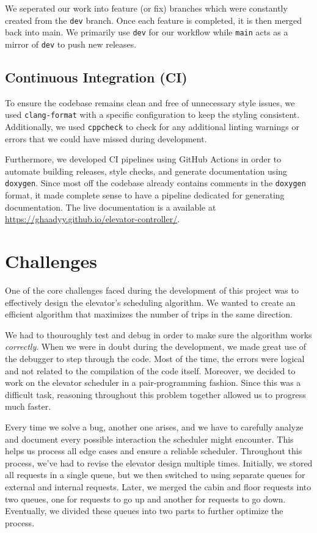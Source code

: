 \documentclass[12pt, a4paper]{report}
\begin{document}
We seperated our work into feature (or fix) branches which were constantly created from the \texttt{dev} branch. Once each feature is completed, it is then merged back into main. We primarily use \texttt{dev} for our workflow while \texttt{main} acts as a mirror of \texttt{dev} to push new releases.

\section{Continuous Integration (CI)}

To ensure the codebase remains clean and free of unnecessary style issues, we used \texttt{clang-format} with a specific configuration to keep the styling consistent. Additionally, we used \texttt{cppcheck} to check for any additional linting warnings or errors that we could have missed during development.

Furthermore, we developed CI pipelines using GitHub Actions in order to automate building releases, style checks, and generate documentation using \texttt{doxygen}. Since most off the codebase already contains comments in the \texttt{doxygen} format, it made complete sense to have a pipeline dedicated for generating documentation. The live documentation is a available at \href{https://ghaadyy.github.io/elevator-controller/}{https://ghaadyy.github.io/elevator-controller/}.

\chapter{Challenges}

One of the core challenges faced during the development of this project was to effectively design the elevator's scheduling algorithm. We wanted to create an efficient algorithm that maximizes the number of trips in the same direction.

We had to thouroughly test and debug in order to make sure the algorithm works \textit{correctly}. When we were in doubt during the development, we made great use of the debugger to step through the code. Most of the time, the errors were logical and not related to the compilation of the code itself. Moreover, we decided to work on the elevator scheduler in a pair-programming fashion. Since this was a difficult task, reasoning throughout this problem together allowed us to progress much faster.

Every time we solve a bug, another one arises, and we have to carefully analyze and document every possible interaction the scheduler might encounter. This helps us process all edge cases and ensure a reliable scheduler. Throughout this process, we've had to revise the elevator design multiple times. Initially, we stored all requests in a single queue, but we then switched to using separate queues for external and internal requests. Later, we merged the cabin and floor requests into two queues, one for requests to go up and another for requests to go down. Eventually, we divided these queues into two parts to further optimize the process.
\end{document}
